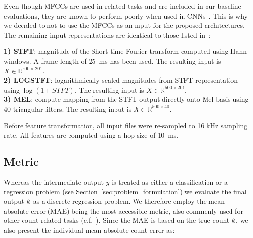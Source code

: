 
Even though MFCCs are used in related tasks and are included in our baseline evaluations, they are known to perform poorly when used in CNNs~\cite{Seltzer13}.
This is why we decided to not to use the MFCCs as an input for the proposed architectures.
The remaining input representations are identical to those listed in~\cite{stoeter17}:

\noindent\textbf{1) STFT}: magnitude of the Short-time Fourier transform computed using Hann-windows.
A frame length of 25~ms has been used.
The resulting input is \(X \in \mathbb{R}^{500 \times 201}\).\\
\textbf{2) LOGSTFT}: logarithmically scaled magnitudes from STFT representation using \(\log(1 + STFT)\).
The resulting input is \(X \in \mathbb{R}^{500 \times 201}\).\\
\textbf{3) MEL}: compute mapping from the STFT output directly onto Mel basis using 40 triangular filters.
The resulting input is \(X \in \mathbb{R}^{500 \times 40}\).
\par
Before feature transformation, all input files were re-sampled to 16 kHz sampling rate. All features are computed using a hop size of 10~ms.

\subsection{Metric}%
\label{ssec:metrics}

Whereas the intermediate output \(y\) is treated as either a classification or a regression problem (see Section~\ref{sec:problem_formulation}) we evaluate the final output \(k \) as a discrete regression problem.
We therefore employ the mean absolute error (MAE) being the most accessible metric, also commonly used for other count related tasks (c.f.~\cite{zhang15, Rezatofigh16}).
Since the MAE is based on the true count \(k \), we also present the individual mean absolute count error as:

